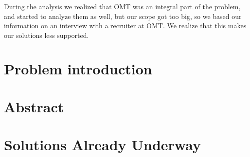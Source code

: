 During the analysis we realized that OMT was an integral part of the problem, and started to analyze them as well, but our scope got too big, so we based our information on an interview with a recruiter at OMT.
We realize that this makes our solutions less supported. 

\section{Problem introduction}

\section{Abstract}


\section{Solutions Already Underway}
